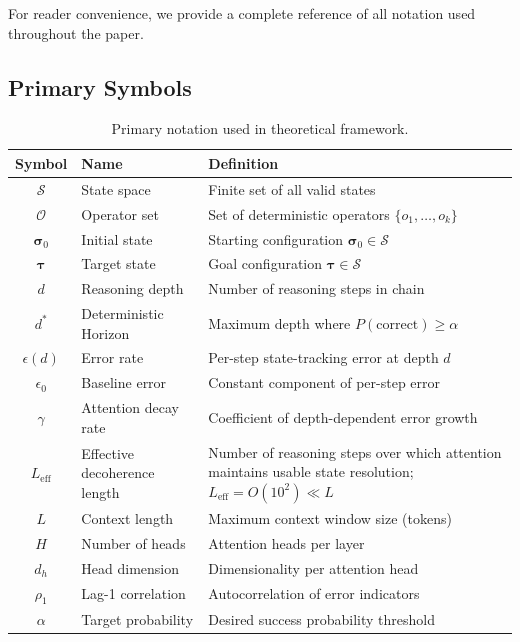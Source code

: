 \documentclass{article}
\theoremstyle{plain}
\theoremstyle{definition}
\theoremstyle{remark}
\newcommand{\state}{\boldsymbol{\sigma}}
\newcommand{\target}{\boldsymbol{\tau}}
\newcommand{\Leff}{L_{\mathrm{eff}}}
\begin{document}
For reader convenience, we provide a complete reference of all notation used throughout the paper.

\subsection{Primary Symbols}

\begin{table}[h]
\centering
\caption{Primary notation used in theoretical framework.}
\label{tab:notation_primary}
\small
\begin{tabular}{@{}clp{7cm}@{}}
\toprule
\textbf{Symbol} & \textbf{Name} & \textbf{Definition} \\
\midrule
$\mathcal{S}$ & State space & Finite set of all valid states \\
$\mathcal{O}$ & Operator set & Set of deterministic operators $\{o_1, \ldots, o_k\}$ \\
$\state_0$ & Initial state & Starting configuration $\state_0 \in \mathcal{S}$ \\
$\target$ & Target state & Goal configuration $\target \in \mathcal{S}$ \\
$d$ & Reasoning depth & Number of reasoning steps in chain \\
$d^*$ & Deterministic Horizon & Maximum depth where $P(\text{correct}) \geq \alpha$ \\
$\epsilon(d)$ & Error rate & Per-step state-tracking error at depth $d$ \\
$\epsilon_0$ & Baseline error & Constant component of per-step error \\
$\gamma$ & Attention decay rate & Coefficient of depth-dependent error growth \\
$\Leff$ & Effective decoherence length & Number of reasoning steps over which attention maintains usable state resolution; $\Leff = O(10^2) \ll L$ \\
$L$ & Context length & Maximum context window size (tokens) \\
$H$ & Number of heads & Attention heads per layer \\
$d_h$ & Head dimension & Dimensionality per attention head \\
$\rho_1$ & Lag-1 correlation & Autocorrelation of error indicators \\
$\alpha$ & Target probability & Desired success probability threshold \\
\bottomrule
\end{tabular}
\end{table}
\end{document}
